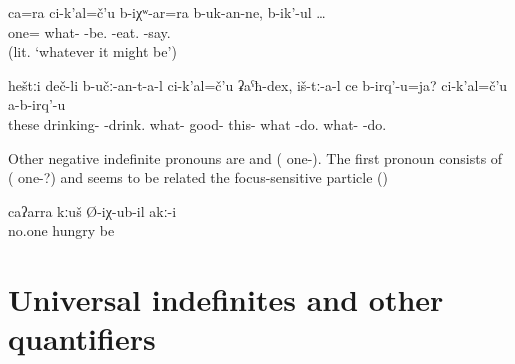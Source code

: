 \begin{exe}
	\ex	\label{saying that they will also eat no matter what} 
	\gll	ca=ra	ci-k'al=č'u	b-iχʷ-ar=ra	b-uk-an-ne,	b-ik'-ul	…\\
		one=	what-	-be.	-eat.	-say.\\
	\glt	{} (lit. `whatever it might be')
	
		\ex	\label{The ones who are drinking anything good, what do they do? They do not do anything (good).} 
	\gll	heštːi	deč-li	b-učː-an-t-a-l	ci-k'al=č'u	ʡaˁħ-dex,	iš-tː-a-l	ce	b-irq'-u=ja?		ci-k'al=č'u	a-b-irq'-u\\
		these	drinking-	-drink.	what-	good-	this-	what	-do.		what-	-do.\\
	\glt	{} 
	\end{exe}

Other negative indefinite pronouns are   and   ( one-). The first pronoun consists of ( one-?) and seems to be related the focus-sensitive particle   ()
%
\begin{exe}
	\ex	\label{ex:No one was hungry}
	\gll	caʔarra	kːuš	Ø-iχ-ub-il	akː-i\\
		no.one	hungry	be	\\
	\glt	{}
\end{exe}



\section{Universal indefinites and other quantifiers}
\label{sec:Universal indefinites and other quantifiers}

